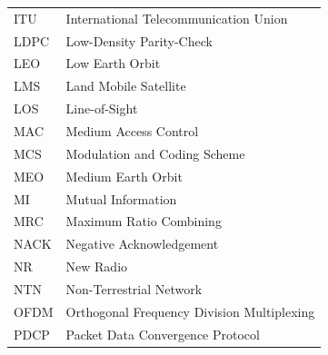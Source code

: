 \begin{tabular}{l l}
\hspace{1cm} ITU      & \hspace{1cm} International Telecommunication Union \\
\hspace{1cm} LDPC     & \hspace{1cm} Low-Density Parity-Check \\
\hspace{1cm} LEO      & \hspace{1cm} Low Earth Orbit \\
\hspace{1cm} LMS      & \hspace{1cm} Land Mobile Satellite \\
\hspace{1cm} LOS      & \hspace{1cm} Line-of-Sight \\
\hspace{1cm} MAC      & \hspace{1cm} Medium Access Control \\
\hspace{1cm} MCS      & \hspace{1cm} Modulation and Coding Scheme \\
\hspace{1cm} MEO      & \hspace{1cm} Medium Earth Orbit \\
\hspace{1cm} MI       & \hspace{1cm} Mutual Information \\
\hspace{1cm} MRC      & \hspace{1cm} Maximum Ratio Combining \\
\hspace{1cm} NACK     & \hspace{1cm} Negative Acknowledgement \\
\hspace{1cm} NR       & \hspace{1cm} New Radio \\
\hspace{1cm} NTN      & \hspace{1cm} Non-Terrestrial Network \\
\hspace{1cm} OFDM     & \hspace{1cm} Orthogonal Frequency Division Multiplexing \\
\hspace{1cm} PDCP     & \hspace{1cm} Packet Data Convergence Protocol \\

\end{tabular}
